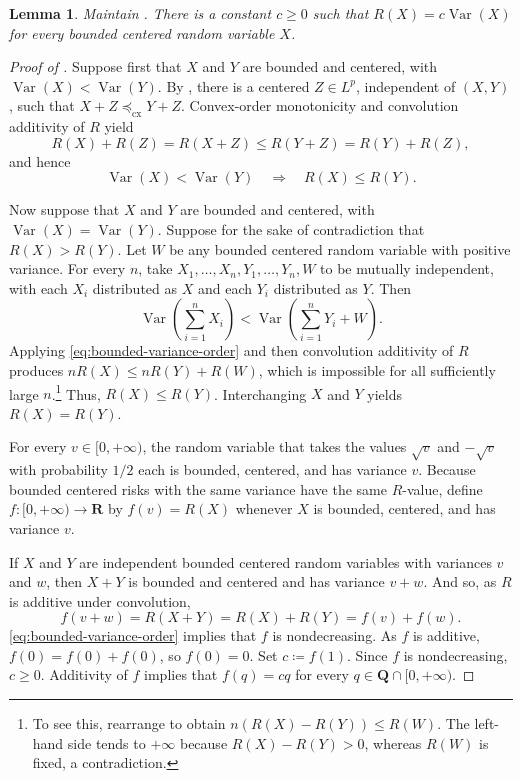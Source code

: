 \documentclass[11pt]{amsart}
\theoremstyle{plain}
\newtheorem{lemma}{Lemma}
\theoremstyle{definition}
\theoremstyle{remark}
\numberwithin{equation}{section}
\newcommand{\1}{\mathbf 1}
\begin{document}
\begin{lemma}\label{lem:bounded-calibration}
Maintain . There is a constant \(c\geq0\) such that \(R(X)=c\operatorname{Var}(X)\) for every bounded centered random variable \(X\).
\end{lemma}

\begin{proof}[Proof of ]
Suppose first that \(X\) and \(Y\) are bounded and centered, with \(\operatorname{Var}(X)<\operatorname{Var}(Y)\). By , there is a centered \(Z\in L^p\), independent of \((X,Y)\), such that \(X+Z\preceq_{\mathrm{cx}}Y+Z\). Convex-order monotonicity and convolution additivity of \(R\) yield
\[R(X)+R(Z)=R(X+Z)\leq R(Y+Z)=R(Y)+R(Z),\]
and hence
\[
\operatorname{Var}(X)<\operatorname{Var}(Y)
\quad \Longrightarrow \quad
R(X)\leq R(Y).
\tag{1}\label{eq:bounded-variance-order}
\]

Now suppose that \(X\) and \(Y\) are bounded and centered, with \(\operatorname{Var}(X)=\operatorname{Var}(Y)\). Suppose for the sake of contradiction that \(R(X)>R(Y)\). Let \(W\) be any bounded centered random variable with positive variance. For every \(n\), take \(X_1,\ldots,X_n,Y_1,\ldots,Y_n,W\) to be mutually independent, with each \(X_i\) distributed as \(X\) and each \(Y_i\) distributed as \(Y\). Then
\[
\operatorname{Var}\left(\sum_{i=1}^nX_i\right)<\operatorname{Var}\left(\sum_{i=1}^nY_i+W\right).
\]
Applying \eqref{eq:bounded-variance-order} and then convolution additivity of \(R\) produces
\(nR(X)\leq nR(Y)+R(W)\), which is impossible for all sufficiently large \(n\).\footnote{To see this, rearrange to obtain \(n\left(R(X)-R(Y)\right)\leq R(W)\). The left-hand side tends to \(+\infty\) because \(R(X)-R(Y)>0\), whereas \(R(W)\) is fixed, a contradiction.} Thus, \(R(X)\leq R(Y)\). Interchanging \(X\) and \(Y\) yields \(R(X)=R(Y)\).

For every \(v\in[0,+\infty)\), the random variable that takes the values \(\sqrt v\) and \(-\sqrt v\) with probability \(1/2\) each is bounded, centered, and has variance \(v\). Because bounded centered risks with the same variance have the same \(R\)-value, define \(f\colon[0,+\infty)\to\mathbf R\) by \(f(v)=R(X)\) whenever \(X\) is bounded, centered, and has variance \(v\).

If \(X\) and \(Y\) are independent bounded centered random variables with variances \(v\) and \(w\), then \(X+Y\) is bounded and centered and has variance \(v+w\). And so, as \(R\) is additive under convolution,
\[
f(v+w)=R(X+Y)=R(X)+R(Y)=f(v)+f(w).
\]
\eqref{eq:bounded-variance-order} implies that \(f\) is nondecreasing. As \(f\) is additive, \(f(0)=f(0)+f(0)\), so \(f(0)=0\). Set \(c\coloneqq f(1)\). Since \(f\) is nondecreasing, \(c\geq0\). Additivity of \(f\) implies that \(f(q)=cq\) for every
\(q\in\mathbf Q\cap[0,+\infty)\).


\end{proof}
\end{document}
